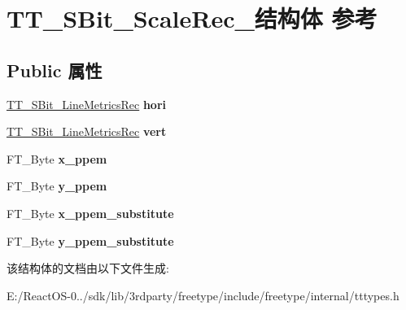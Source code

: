\hypertarget{struct_t_t___s_bit___scale_rec__}{}\section{T\+T\+\_\+\+S\+Bit\+\_\+\+Scale\+Rec\+\_\+结构体 参考}
\label{struct_t_t___s_bit___scale_rec__}
\subsection*{Public 属性}
\begin{DoxyCompactItemize}
\item 
\mbox{\label{struct_t_t___s_bit___scale_rec___a2a61bc97ebb7ed996170a03612ffbbc0}} 
\hyperlink{struct_t_t___s_bit___line_metrics_rec__}{T\+T\+\_\+\+S\+Bit\+\_\+\+Line\+Metrics\+Rec} {\bfseries hori}
\item 
\mbox{\label{struct_t_t___s_bit___scale_rec___acbf5c459602d9f52ac04a914e2f12375}} 
\hyperlink{struct_t_t___s_bit___line_metrics_rec__}{T\+T\+\_\+\+S\+Bit\+\_\+\+Line\+Metrics\+Rec} {\bfseries vert}
\item 
\mbox{\label{struct_t_t___s_bit___scale_rec___a235731b0452ea063cccacd2f59b3f44c}} 
F\+T\+\_\+\+Byte {\bfseries x\+\_\+ppem}
\item 
\mbox{\label{struct_t_t___s_bit___scale_rec___aa4c1fb419ea55c8c587ba81700c6ce66}} 
F\+T\+\_\+\+Byte {\bfseries y\+\_\+ppem}
\item 
\mbox{\label{struct_t_t___s_bit___scale_rec___a71955e363b0b5da84ed2c15d0e6f832d}} 
F\+T\+\_\+\+Byte {\bfseries x\+\_\+ppem\+\_\+substitute}
\item 
\mbox{\label{struct_t_t___s_bit___scale_rec___a3a9f554d0153f9e3022898c1f59a7b63}} 
F\+T\+\_\+\+Byte {\bfseries y\+\_\+ppem\+\_\+substitute}
\end{DoxyCompactItemize}


该结构体的文档由以下文件生成\+:\begin{DoxyCompactItemize}
\item 
E\+:/\+React\+O\+S-\/0../sdk/lib/3rdparty/freetype/include/freetype/internal/tttypes.\+h\end{DoxyCompactItemize}

